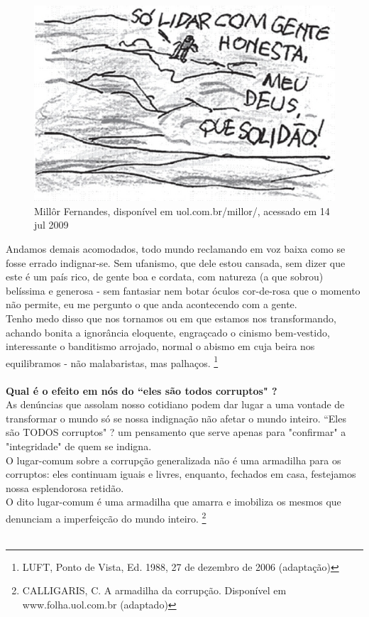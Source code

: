 \documentclass[10pt,a4paper]{article}
\begin{document}
\begin{figure}[!ht]
	\centering
     \includegraphics[scale=0.6]{redacao.jpg}
     \caption{Mill\^{o}r Fernandes, dispon\'ivel em uol.com.br/millor/, acessado em 14 jul 2009}
     \label{redacao}
\end{figure}


Andamos demais acomodados, todo mundo reclamando em voz baixa como se fosse errado indignar-se. Sem ufanismo, que dele estou cansada, sem dizer que este \'e um pa\'is rico, de gente boa e cordata, com natureza (a que sobrou) bel\'issima e generosa - sem fantasiar nem botar \'oculos cor-de-rosa que o momento n\~ao permite, eu me pergunto o que anda acontecendo com a gente. \\
 Tenho medo disso que nos tornamos ou em que estamos nos transformando, achando bonita a ignor\^ancia eloquente, engra\c{c}{c}ado o cinismo bem-vestido, interessante o banditismo arrojado, normal o abismo em cuja beira nos equilibramos - n\~ao malabaristas, mas palha\c{c}os. \footnote{LUFT, Ponto de Vista, Ed. 1988, 27 de dezembro de 2006 (adapta\c{c}\~ao)} \\ \\

\textbf{Qual \'e o efeito em n\'os do ``eles s\~ao todos corruptos" ?} \\
As den\'uncias que assolam nosso cotidiano podem dar lugar a uma vontade de transformar o mundo s\'o se nossa indigna\c{c}\~ao n\~ao afetar o mundo inteiro. ``Eles s\~ao TODOS corruptos" ? um pensamento que serve apenas para "confirmar" a "integridade" de quem se indigna. \\
O lugar-comum sobre a corrup\c{c}\~ao generalizada n\~ao \'e uma armadilha para os corruptos: eles continuam iguais e livres, enquanto, fechados em casa, festejamos nossa esplendorosa retid\~ao. \\
O dito lugar-comum \'e uma armadilha que amarra e imobiliza os mesmos que denunciam a imperfei\c{c}{c}\~ao do mundo inteiro. \footnote{CALLIGARIS, C. A armadilha da corrup\c{c}\~ao. Dispon\'ivel em www.folha.uol.com.br (adaptado)} \\ \\
\end{document}
